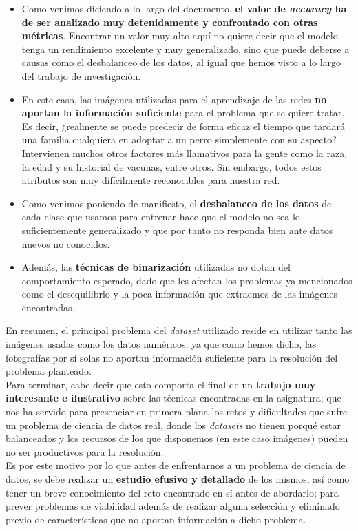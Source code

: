 \documentclass[]{article}
\begin{document}
	\begin{itemize}
		\item Como venimos diciendo a lo largo del documento, \textbf{el valor de \textit{accuracy} ha de ser analizado muy detenidamente y confrontado con otras métricas}. Encontrar un valor muy alto aquí no quiere decir que el modelo tenga un rendimiento excelente y muy generalizado, sino que puede deberse a causas como el desbalanceo de los datos, al igual que hemos visto a lo largo del trabajo de investigación.
		\item En este caso, las imágenes utilizadas para el aprendizaje de las redes \textbf{no aportan la información suficiente} para el problema que se quiere tratar. Es decir, ¿realmente se puede predecir de forma eficaz el tiempo que tardará una familia cualquiera en adoptar a un perro simplemente con su aspecto? Intervienen muchos otros factores más llamativos para la gente como la raza, la edad y su historial de vacunas, entre otros. Sin embargo, todos estos atributos son muy difícilmente reconocibles para nuestra red.
		\item Como venimos poniendo de manifiesto, el \textbf{desbalanceo de los datos} de cada clase que usamos para entrenar hace que el modelo no sea lo suficientemente generalizado y que por tanto no responda bien ante datos nuevos no conocidos.
		\item Además, las \textbf{técnicas de binarización} utilizadas no dotan del comportamiento esperado, dado que les afectan los problemas ya mencionados como el desequilibrio y la poca información que extraemos de las imágenes encontradas.
	\end{itemize}

	En resumen, el principal problema del \textit{dataset} utilizado reside en utilizar tanto las imágenes usadas como los datos numéricos, ya que como hemos dicho, las fotografías por sí solas no aportan información suficiente para la resolución del problema planteado.\\

	Para terminar, cabe decir que esto comporta el final de un \textbf{trabajo muy interesante e ilustrativo} sobre las técnicas encontradas en la asignatura; que nos ha servido para presenciar en primera plana los retos y dificultades que sufre un problema de ciencia de datos real, donde los \textit{datasets} no tienen porqué estar balanceados y los recursos de los que disponemos (en este caso imágenes) pueden no ser productivos para la resolución.\\
	
	Es por este motivo por lo que antes de enfrentarnos a un problema de ciencia de datos, se debe realizar un \textbf{estudio efusivo y detallado} de los mismos, así como tener un breve conocimiento del reto encontrado en sí antes de abordarlo; para prever problemas de viabilidad además de realizar alguna selección y eliminado previo de características que no aportan información a dicho problema.

\newpage


\end{document}
